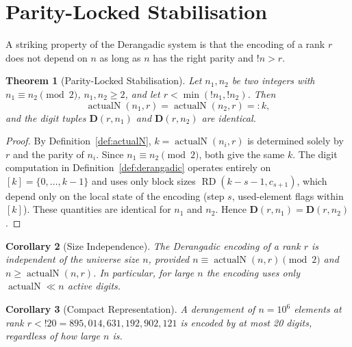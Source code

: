 \documentclass[11pt,a4paper]{article}
\newtheorem{theorem}{Theorem}[section]
\newtheorem{corollary}[theorem]{Corollary}
\newcommand{\subfact}[1]{!{#1}} %
\newcommand{\rder}[2]{\operatorname{RD}(#1,#2)} %
\newcommand{\actualN}{\operatorname{actualN}}
\begin{document}
    \section{Parity-Locked Stabilisation}
    \label{sec:stabilisation}

    A striking property of the Derangadic system is that the encoding of a
    rank $r$ does not depend on $n$ as long as $n$ has the right parity and
    $\subfact{n} > r$.

    \begin{theorem}[Parity-Locked Stabilisation]
        \label{thm:stabilisation}
        Let $n_1, n_2$ be two integers with $n_1 \equiv n_2 \pmod{2}$, $n_1, n_2 \geq 2$,
        and let $r < \min(\subfact{n_1}, \subfact{n_2})$. Then
        \[
            \actualN(n_1, r) = \actualN(n_2, r) =: k,
        \]
        and the digit tuples $\mathbf{D}(r, n_1)$ and $\mathbf{D}(r, n_2)$ are
        identical.
    \end{theorem}

    \begin{proof}
        By Definition~\ref{def:actualN}, $k = \actualN(n_i, r)$ is determined solely
        by $r$ and the parity of $n_i$. Since $n_1 \equiv n_2 \pmod{2}$, both give
        the same $k$. The digit computation in Definition~\ref{def:derangadic}
        operates entirely on $[k] = \{0,\dots,k-1\}$ and uses only block sizes
        $\rder{k-s-1}{c_{s+1}}$, which depend only on the local state of the
        encoding (step $s$, used-element flags within $[k]$). These quantities
        are identical for $n_1$ and $n_2$. Hence $\mathbf{D}(r, n_1) = \mathbf{D}(r, n_2)$.
    \end{proof}

    \begin{corollary}[Size Independence]
        \label{cor:size-independence}
        The Derangadic encoding of a rank $r$ is independent of the universe size
        $n$, provided $n \equiv \actualN(n,r) \pmod{2}$ and $n \geq \actualN(n,r)$.
        In particular, for large $n$ the encoding uses only $\actualN \ll n$ active
        digits.
    \end{corollary}

    \begin{corollary}[Compact Representation]
        A derangement of $n = 10^6$ elements at rank $r < \subfact{20} = 895{,}014{,}631{,}192{,}902{,}121$
        is encoded by at most 20 digits, regardless of how large $n$ is.
    \end{corollary}
\end{document}
